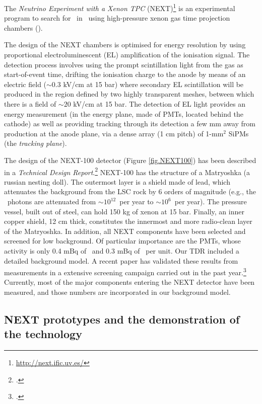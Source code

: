 \documentclass[a4paper,11pt,oneside]{article}
\begin{document}
The \emph{Neutrino Experiment with a Xenon TPC} (NEXT)\footnote{\href{http://next.ific.uv.es/}{http://next.ific.uv.es/}} is an experimental program to search for \bbonu\ in \XE\ using  high-pressure xenon gas  time projection chambers (\HPXE). 

The design of the NEXT chambers is optimised for energy resolution by using proportional electroluminescent (EL) amplification of the ionisation signal. The detection process involves using the prompt scintillation light from the gas as start-of-event time, drifting the ionisation charge to the anode by means of an electric field ($\sim0.3$ kV/cm at 15 bar) where secondary EL scintillation will be produced in the region defined by two highly transparent meshes, between which there is a field of $\sim20$ kV/cm at 15 bar. The detection of EL light provides an energy measurement (in the energy plane, made of PMTs, located behind the cathode) as well as providing tracking through its detection a few mm away from production at the anode plane, via a dense array (1 cm pitch) of 1-mm$^{2}$ SiPMs (the \emph{tracking plane}).

The design of the NEXT-100 detector (Figure \ref{fig.NEXT100}) has been described in a \emph{Technical Design Report}.\footcite{Alvarez:2012haa} NEXT-100 has the structure of a Matryoshka (a russian nesting doll). The outermost layer is a shield made of lead, which attenuates the background from the LSC rock by 6 orders of magnitude (e.g., the \TL\ photons are attenuated from $\sim 10^{12}$~per year to $\sim 10^{6}$~per year). The pressure vessel, built out of steel, can hold 150 kg of xenon at 15 bar. Finally, an inner copper shield, 12 cm thick, constitutes the innermost and more radio-clean layer of the Matryoshka. In addition, all NEXT components have been selected and screened for low background. Of particular importance are the PMTs, whose activity is only 0.4 mBq of \BI\ and 0.3 mBq of \TL\ per unit. Our TDR included a detailed background model. A recent paper has validated these results from measurements in a extensive screening campaign carried out in the past year.\footcite{Alvarez:2012as} Currently, most of the major components entering the NEXT detector have been measured, and those numbers are incorporated in our background model. 

\subsection*{NEXT prototypes and the demonstration of the technology}
\end{document}
